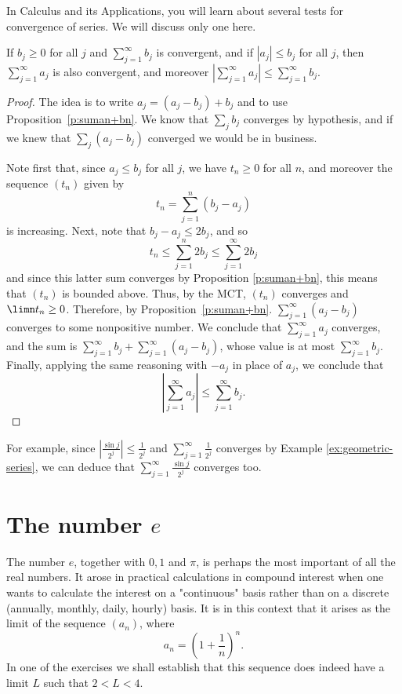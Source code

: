 \documentclass[11pt,dvipsnames]{book}
\numberwithin{figure}{section} %
\numberwithin{table}{section} %
\begin{document}
\medskip
In Calculus and its Applications, you will learn about several tests for convergence of series. We will discuss only one here.

\begin{theorem}
If $b_j \geq 0$ for all $j$ and $\sum_{j=1}^\infty b_{j}$ is convergent, and if $|a_{j}|\leq b_{j}$ for all $j$, then $\sum_{j=1}^\infty a_{j}$ is also convergent, and
moreover $ |\sum_{j=1}^\infty a_j| \leq \sum_{j=1}^\infty b_j.$
\end{theorem}

\begin{proof}
The idea is to write $a_j = (a_j - b_j) + b_j$ and to use Proposition~\ref{p:suman+bn}. We know that $\sum_j b_j$ converges by hypothesis, and if we knew that $\sum_j(a_j - b_j)$ converged we would be in business.

Note first that, since $a_j \leq b_j$ for all $j$, we have $t_n \geq 0$ for all $n$, and moreover the sequence $(t_n)$ given by
\[
t_{n}=\sum_{j=1}^{n}(b_{j}-a_{j})
\]
is increasing. Next, note that $b_{j}-a_{j}\leq 2b_{j}$, and so
\[
t_{n}\leq \sum_{j=1}^{n}2b_{j}\leq \sum_{j=1}^{\infty}2b_{j}\]
and since this latter sum converges by Proposition \ref{p:suman+bn}, this means that $(t_{n})$ is bounded above. Thus, by the MCT, $(t_{n})$ converges
and $\limn t_n \geq 0$. Therefore, by Proposition~\ref{p:suman+bn}. $\sum_{j=1}^\infty(a_j - b_j)$
converges to some nonpositive number.
We conclude that $\sum_{j=1}^\infty a_{j}$ converges, and the sum is $\sum_{j=1}^\infty b_j + \sum_{j=1}^\infty (a_j - b_j)$, whose value is at most $\sum_{j=1}^\infty b_j$. Finally, applying the same reasoning with $-a_j$ in place of $a_j$, we conclude that
\[
|\sum_{j=1}^\infty a_j| \leq \sum_{j=1}^\infty b_j.
\]
\end{proof}

For example, since $\left|\frac{\sin j}{2^{j}}\right|\leq \frac{1}{2^{j}}$ and $\sum_{j=1}^\infty \frac{1}{2^{j}}$ converges by Example \ref{ex:geometric-series}, we can deduce that $\sum_{j=1}^\infty \frac{\sin j}{2^{j}}$ converges too.

\section{The number $e$}
The number $e$, together with $0,1$ and $\pi$, is perhaps the most important of all the real numbers.
It arose in practical calculations in compound interest when one wants to calculate the interest on a "continuous" basis rather than on a discrete (annually, monthly, daily, hourly) basis. It is in this context that it arises as the limit of the sequence $(a_n)$, where
\[ a_n = \left(1 + \frac{1}{n}\right)^n.\]
In one of the exercises we shall establish that this sequence does indeed have a limit $L$ such that $2 < L < 4$.
\end{document}
